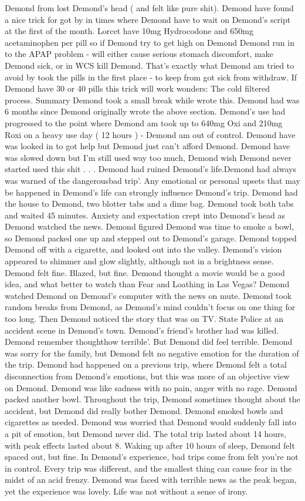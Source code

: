 \documentclass[12pt]{book}
\begin{document}
Demond from lost Demond's head ( and felt like pure shit). Demond have found a nice trick for got by in times where Demond have to wait on Demond's script at the first of the month. Lorcet have 10mg Hydrocodone and 650mg acetaminophen per pill so if Demond try to get high on Demond Demond run in to the APAP problem - will either cause serious stomach discomfort, make Demond sick, or in WCS kill Demond. That's exactly what Demond am tried to avoid by took the pills in the first place - to keep from got sick from withdraw. If Demond have 30 or 40 pills this trick will work wonders: The cold filtered process. Summary Demond took a small break while wrote this. Demond had was 6 months since Demond originally wrote the above section. Demond's use had progressed to the point where Demond am took up to 640mg Oxi and 210mg Roxi on a heavy use day ( 12 hours ) - Demond am out of control. Demond have was looked in to got help but Demond just can't afford Demond. Demond have was slowed down but I'm still used way too much, Demond wish Demond never started used this shit . . .  Demond had ruined Demond's life.Demond had always was warned of the dangerousbad trip'. Any emotional or personal upsets that may be happened in Demond's life can strongly influence Demond's trip. Demond had the house to Demond, two blotter tabs and a dime bag. Demond took both tabs and waited 45 minutes. Anxiety and expectation crept into Demond's head as Demond watched the news. Demond figured Demond was time to smoke a bowl, so Demond packed one up and stepped out to Demond's garage. Demond topped Demond off with a cigarette, and looked out into the valley. Demond's vision appeared to shimmer and glow slightly, although not in a brightness sense. Demond felt fine. Blazed, but fine. Demond thought a movie would be a good idea, and what better to watch than Fear and Loathing in Las Vegas? Demond watched Demond on Demond's computer with the news on mute. Demond took random breaks from Demond, as Demond's mind couldn't focus on one thing for too long. Then Demond noticed the story that was on TV. State Police at an accident scene in Demond's town. Demond's friend's brother had was killed. Demond remember thoughthow terrible'. But Demond did feel terrible. Demond was sorry for the family, but Demond felt no negative emotion for the duration of the trip. Demond had happened on a previous trip, where Demond felt a total disconnection from Demond's emotions, but this was more of an objective view on Demond. Demond was like sadness with no pain, anger with no rage. Demond packed another bowl. Throughout the trip, Demond sometimes thought about the accident, but Demond did really bother Demond. Demond smoked bowls and cigarettes as needed. Demond was worried that Demond would suddenly fall into a pit of emotion, but Demond never did. The total trip lasted about 14 hours, with peak effects lasted about 8. Waking up after 10 hours of sleep, Demond felt spaced out, but fine. In Demond's experience, bad trips come from felt you're not in control. Every trip was different, and the smallest thing can cause fear in the midst of an acid frenzy. Demond was faced with terrible news as the peak began, yet the experience was lovely. Life was not without a sense of irony.
\end{document}
